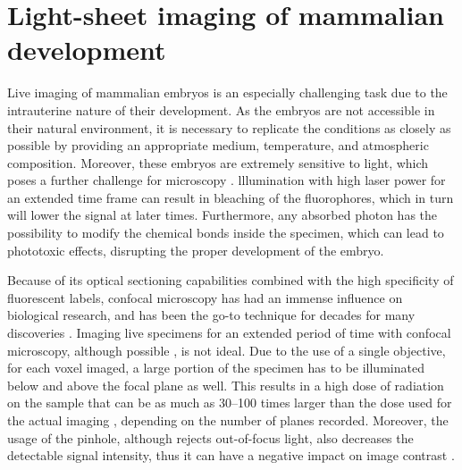 \section{Light-sheet imaging of mammalian development}

  Live imaging of mammalian embryos is an especially challenging task due to the intrauterine nature of their development. As the embryos are not accessible in their natural environment, it is necessary to replicate the conditions as closely as possible by providing an appropriate medium, temperature, and atmospheric composition. Moreover, these embryos are extremely sensitive to light, which poses a further challenge for microscopy \cite{nowotschin_chapter_2010}.  lllumination with high laser power for an extended time frame can result in bleaching of the fluorophores, which in turn will lower the signal at later times. Furthermore, any absorbed photon has the possibility to modify the chemical bonds inside the specimen, which can lead to phototoxic effects, disrupting the proper development of the embryo.

  Because of its optical sectioning capabilities combined with the high specificity of fluorescent labels, confocal microscopy has had an immense influence on biological research, and has been the go-to technique for decades for many discoveries \cite{shotton_confocal_1989,graf_live_2005,jonkman_any_2015}.
  Imaging live specimens for an extended period of time with confocal microscopy, although possible \cite{aldaz_live_2010, maitre_asymmetric_2016}, is not ideal. Due to the use of a single objective, for each voxel imaged, a large portion of the specimen has to be illuminated below and above the focal plane as well. This results in a high dose of radiation on the sample that can be as much as 30--100 times larger than the dose used for the actual imaging \cite{reynaud_light_2008}, depending on the number of planes recorded.  
  Moreover, the usage of the pinhole, although rejects out-of-focus light, also decreases the detectable signal intensity, thus it can have a negative impact on image contrast \cite{stelzer_contrast_1998}.

